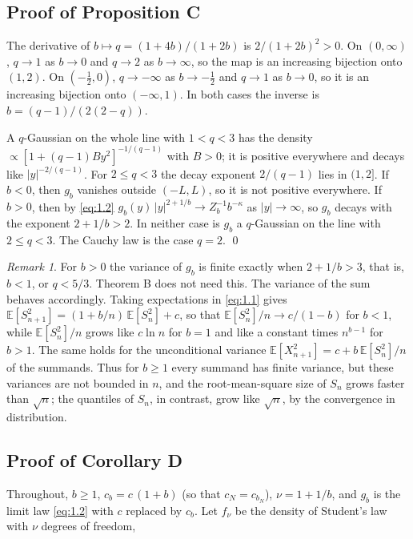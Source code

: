 \documentclass[aip,jmp,preprint,onecolumn,floatfix,superscriptaddress,nofootinbib,11pt]{revtex4-2}
\theoremstyle{plain}
\theoremstyle{remark}
\newtheorem*{remark}{Remark}
\numberwithin{equation}{section}
\newcommand{\E}{\mathbb{E}}
\begin{document}
\subsection{Proof of Proposition C}\label{sec:5_1}

The derivative of $b\mapsto q=(1+4b)/(1+2b)$ is $2/(1+2b)^{2}>0$. On $(0,\infty)$, $q\to1$ as $b\to0$ and $q\to2$ as $b\to\infty$, so the map is an increasing bijection onto $(1,2)$. On $(-\tfrac12,0)$, $q\to-\infty$ as $b\to-\tfrac12$ and $q\to1$ as $b\to0$, so it is an increasing bijection onto $(-\infty,1)$. In both cases the inverse is $b=(q-1)/(2(2-q))$.

A $q$-Gaussian on the whole line with $1<q<3$ has the density $\propto[1+(q-1)By^{2}]^{-1/(q-1)}$ with $B>0$; it is positive everywhere and decays like $|y|^{-2/(q-1)}$. For $2\le q<3$ the decay exponent $2/(q-1)$ lies in $(1,2]$. If $b<0$, then $g_b$ vanishes outside $(-L,L)$, so it is not positive everywhere. If $b>0$, then by \eqref{eq:1.2} $g_b(y)\,|y|^{2+1/b}\to Z_b^{-1}b^{-\kappa}$ as $|y|\to\infty$, so $g_b$ decays with the exponent $2+1/b>2$. In neither case is $g_b$ a $q$-Gaussian on the line with $2\le q<3$. The Cauchy law is the case $q=2$. \qed

\begin{remark}
For $b>0$ the variance of $g_b$ is finite exactly when $2+1/b>3$, that is, $b<1$, or $q<5/3$. Theorem B does not need this. The variance of the sum behaves accordingly. Taking expectations in \eqref{eq:1.1} gives $\E[S_{n+1}^{2}]=(1+b/n)\,\E[S_n^{2}]+c$, so that $\E[S_n^{2}]/n\to c/(1-b)$ for $b<1$, while $\E[S_n^{2}]/n$ grows like $c\ln n$ for $b=1$ and like a constant times $n^{b-1}$ for $b>1$. The same holds for the unconditional variance $\E[X_{n+1}^{2}]=c+b\,\E[S_n^{2}]/n$ of the summands. Thus for $b\ge1$ every summand has finite variance, but these variances are not bounded in $n$, and the root-mean-square size of $S_n$ grows faster than $\sqrt n$; the quantiles of $S_n$, in contrast, grow like $\sqrt n$, by the convergence in distribution.
\end{remark}

\subsection{Proof of Corollary D}\label{sec:5_2}

Throughout, $b\ge1$, $c_b=c\,(1+b)$ (so that $c_N=c_{b_N}$), $\nu=1+1/b$, and $g_b$ is the limit law \eqref{eq:1.2} with $c$ replaced by $c_b$. Let $f_\nu$ be the density of Student's law with $\nu$ degrees of freedom,
\end{document}
